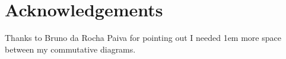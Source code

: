 \chapter{Acknowledgements}\label{chap:acknowledgements}

Thanks to Bruno da Rocha Paiva for pointing out I needed 1em more space between
my commutative diagrams.

